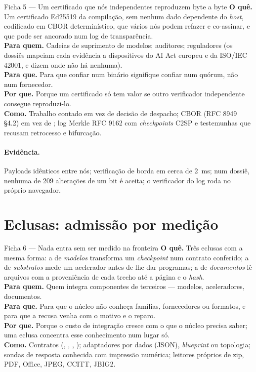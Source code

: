 \begin{ficha}{Ficha 5 --- Um certificado que nós independentes reproduzem byte a byte}
\textbf{O quê.} Um certificado Ed25519 da compilação, sem nenhum dado dependente do \textit{host}, codificado em CBOR determinístico, que vários nós podem refazer e co-assinar, e que pode ser ancorado num log de transparência.\\
\textbf{Para quem.} Cadeias de suprimento de modelos; auditores; reguladores (os dossiês mapeiam cada evidência a dispositivos do AI Act europeu e da ISO/IEC 42001, e dizem onde não há nenhuma).\\
\textbf{Para que.} Para que confiar num binário signifique confiar num quórum, não num fornecedor.\\
\textbf{Por que.} Porque um certificado só tem valor se outro verificador independente consegue reproduzi-lo.\\
\textbf{Como.} Trabalho contado em vez de decisão de despacho; CBOR (RFC 8949 §4.2) em vez de ; log Merkle RFC 9162 com \textit{checkpoints} C2SP e testemunhas que recusam retrocesso e bifurcação.
\end{ficha}

\paragraph{Evidência.} Payloads idênticos entre nós; verificação de borda em cerca de 2~ms; num dossiê, nenhuma de 209 alterações de um bit é aceita; o verificador do log roda no próprio navegador.

\section{Eclusas: admissão por medição}\label{sec:inov-eclusas}

\begin{ficha}{Ficha 6 --- Nada entra sem ser medido na fronteira}
\textbf{O quê.} Três eclusas com a mesma forma: a de \emph{modelos} transforma um \textit{checkpoint} num contrato conferido; a de \emph{substratos} mede um acelerador antes de lhe dar programas; a de \emph{documentos} lê arquivos com a proveniência de cada trecho até a página e o \textit{hash}.\\
\textbf{Para quem.} Quem integra componentes de terceiros --- modelos, aceleradores, documentos.\\
\textbf{Para que.} Para que o núcleo não conheça famílias, fornecedores ou formatos, e para que a recusa venha com o motivo e o reparo.\\
\textbf{Por que.} Porque o custo de integração cresce com o que o núcleo precisa saber; uma eclusa concentra esse conhecimento num lugar só.\\
\textbf{Como.} Contratos (, , , ); adaptadores por dados (JSON), \textit{blueprint} ou topologia; sondas de resposta conhecida com impressão numérica; leitores próprios de zip, PDF, Office, JPEG, CCITT, JBIG2.
\end{ficha}

